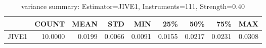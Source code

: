 \begin{table}[ht]
\centering
\caption{variance summary: Estimator=JIVE1, Instruments=111, Strength=0.40}
\begin{tabular}{lrrrrrrrr}
\toprule
 & COUNT & MEAN & STD & MIN & 25\% & 50\% & 75\% & MAX \\
\midrule
JIVE1 & 10.0000 & 0.0199 & 0.0066 & 0.0091 & 0.0155 & 0.0217 & 0.0231 & 0.0308 \\
\bottomrule
\end{tabular}
\end{table}
